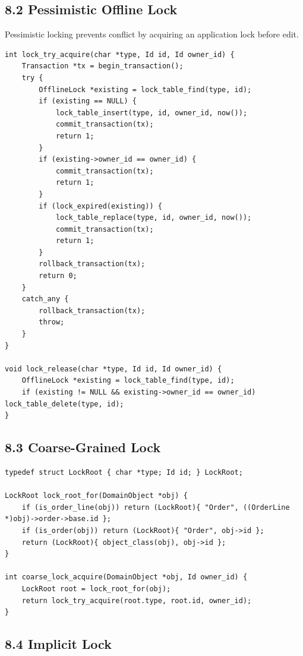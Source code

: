 \documentclass[11pt]{article}
\begin{document}
\subsection{8.2 Pessimistic Offline
Lock}\label{pessimistic-offline-lock}

Pessimistic locking prevents conflict by acquiring an application lock
before edit.

\begin{verbatim}
int lock_try_acquire(char *type, Id id, Id owner_id) {
    Transaction *tx = begin_transaction();
    try {
        OfflineLock *existing = lock_table_find(type, id);
        if (existing == NULL) {
            lock_table_insert(type, id, owner_id, now());
            commit_transaction(tx);
            return 1;
        }
        if (existing->owner_id == owner_id) {
            commit_transaction(tx);
            return 1;
        }
        if (lock_expired(existing)) {
            lock_table_replace(type, id, owner_id, now());
            commit_transaction(tx);
            return 1;
        }
        rollback_transaction(tx);
        return 0;
    }
    catch_any {
        rollback_transaction(tx);
        throw;
    }
}

void lock_release(char *type, Id id, Id owner_id) {
    OfflineLock *existing = lock_table_find(type, id);
    if (existing != NULL && existing->owner_id == owner_id) lock_table_delete(type, id);
}
\end{verbatim}

\subsection{8.3 Coarse-Grained Lock}\label{coarse-grained-lock}

\begin{verbatim}
typedef struct LockRoot { char *type; Id id; } LockRoot;

LockRoot lock_root_for(DomainObject *obj) {
    if (is_order_line(obj)) return (LockRoot){ "Order", ((OrderLine *)obj)->order->base.id };
    if (is_order(obj)) return (LockRoot){ "Order", obj->id };
    return (LockRoot){ object_class(obj), obj->id };
}

int coarse_lock_acquire(DomainObject *obj, Id owner_id) {
    LockRoot root = lock_root_for(obj);
    return lock_try_acquire(root.type, root.id, owner_id);
}
\end{verbatim}

\subsection{8.4 Implicit Lock}\label{implicit-lock}
\end{document}
